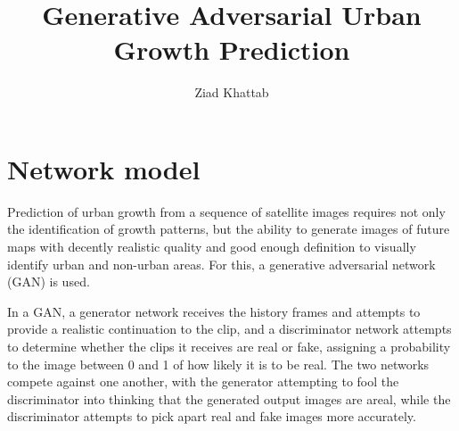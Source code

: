 \documentclass{article}
\title{\huge{Generative Adversarial Urban Growth Prediction}}
\author{Ziad Khattab}
\date{}
\begin{document}
\maketitle

\section{Network model}

Prediction of urban growth from a sequence of satellite images requires not only the identification of growth patterns, but the ability to generate images of future maps with decently realistic quality and good enough definition to visually identify urban and non-urban areas. For this, a generative adversarial network (GAN) is used.

In a GAN, a generator network receives the history frames and attempts to provide a realistic continuation to the clip, and a discriminator network attempts to determine whether the clips it receives are real or fake, assigning a probability to the image between 0 and 1 of how likely it is to be real. The two networks compete against one another, with the generator attempting to fool the discriminator into thinking that the generated output images are areal, while the discriminator attempts to pick apart real and fake images more accurately.

\begin{minipage}[t]{\linewidth}
    \centering
\end{minipage}
\end{document}
